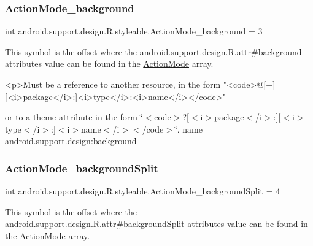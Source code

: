 \subsubsection{\texorpdfstring{Action\+Mode\+\_\+background}{ActionMode\_background}}
{\footnotesize\ttfamily int android.\+support.\+design.\+R.\+styleable.\+Action\+Mode\+\_\+background = 3\hspace{0.3cm}{\ttfamily [static]}}

This symbol is the offset where the \hyperlink{classandroid_1_1support_1_1design_1_1R_1_1attr_aeb618e21eef4362611649c7ca5a38343}{android.\+support.\+design.\+R.\+attr\#background} attribute\textquotesingle{}s value can be found in the \hyperlink{classandroid_1_1support_1_1design_1_1R_1_1styleable_aece7cc3345738baf4a59955f870e1507}{Action\+Mode} array.

\begin{DoxyVerb}      <p>Must be a reference to another resource, in the form "<code>@[+][<i>package</i>:]<i>type</i>:<i>name</i></code>"
\end{DoxyVerb}
 or to a theme attribute in the form \char`\"{}$<$code$>$?\mbox{[}$<$i$>$package$<$/i$>$\+:\mbox{]}\mbox{[}$<$i$>$type$<$/i$>$\+:\mbox{]}$<$i$>$name$<$/i$>$$<$/code$>$\char`\"{}.  name android.\+support.\+design\+:background \mbox{\label{classandroid_1_1support_1_1design_1_1R_1_1styleable_a22f0bded352156527e400e1037bcd318}} 
\subsubsection{\texorpdfstring{Action\+Mode\+\_\+background\+Split}{ActionMode\_backgroundSplit}}
{\footnotesize\ttfamily int android.\+support.\+design.\+R.\+styleable.\+Action\+Mode\+\_\+background\+Split = 4\hspace{0.3cm}{\ttfamily [static]}}

This symbol is the offset where the \hyperlink{classandroid_1_1support_1_1design_1_1R_1_1attr_a801eb11b48747bfa6b51d9658255cfec}{android.\+support.\+design.\+R.\+attr\#background\+Split} attribute\textquotesingle{}s value can be found in the \hyperlink{classandroid_1_1support_1_1design_1_1R_1_1styleable_aece7cc3345738baf4a59955f870e1507}{Action\+Mode} array.

